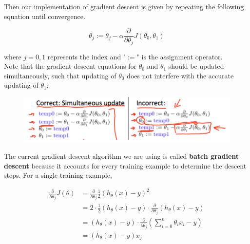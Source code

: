 \documentclass{article}
\begin{document}
        \noindent Then our implementation of gradient descent is given by repeating the following equation until
        convergence.

        \begin{equation*}
            \theta_j := \theta_j-\alpha\frac{\partial}{\partial \theta_j}J(\theta_0,\theta_1)
        \end{equation*}

        \noindent where $j=0,1$ represents the index and "$:=$" is the assignment operator. \\

        \noindent Note that the gradient descent equations for $\theta_0$ and $\theta_1$ should be updated
        simultaneously, such that updating of $\theta_0$ does not interfere with the accurate updating of $\theta_1$:

        \begin{figure}[hbt!]
            \centering
            \includegraphics[scale=0.75]{Resources/Simultaneous_Update}
        \end{figure}

        \noindent The current gradient descent algorithm we are using is called \textbf{batch gradient descent}
        because it accounts for every training example to determine the descent steps. For a single training
        example,

        \begin{align*}
            \frac{\partial}{\partial\theta_j}J(\theta)  &= \frac{\partial}{\partial\theta_j}\frac{1}{2}(h_\theta(x)-y)^2 \\
                                                        &= 2\cdot\frac{1}{2}(h_\theta(x)-y)\cdot
                                                           \frac{\partial}{\partial\theta_j}(h_\theta(x)-y) \\
                                                        &= (h_\theta(x)-y)\cdot\frac{\partial}{\partial\theta_j}
                                                           \left(\sum^n_{i=0}\theta_i x_i-y\right) \\
                                                        &= (h_\theta(x)-y)x_j
        \end{align*}
\end{document}
